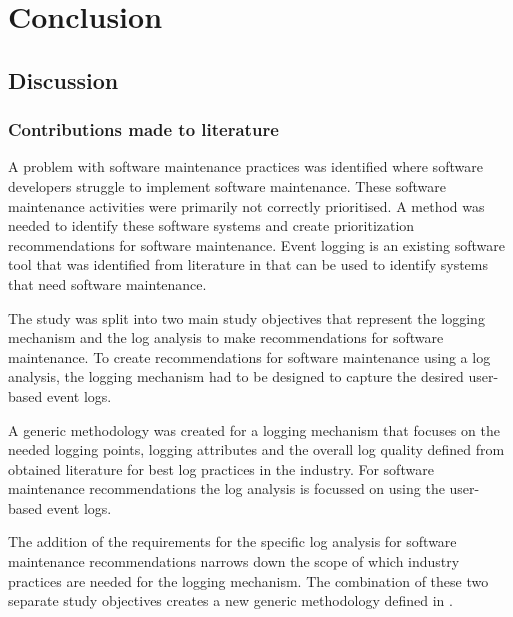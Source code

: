 \chapter{Conclusion}
\label{chap:4}

\section{Discussion}

\subsection{Contributions made to literature}
A problem with software maintenance practices was identified where software developers struggle to implement software maintenance. These software maintenance activities were primarily not correctly prioritised. A method was needed to identify these software systems and create prioritization recommendations for software maintenance. Event logging is an existing software tool that was identified from literature in  that can be used to identify systems that need software maintenance. \par The study was split into two main study objectives that represent the logging mechanism and the log analysis to make recommendations for software maintenance. To create recommendations for software maintenance using a log analysis, the logging mechanism had to be designed to capture the desired user-based event logs. \par A generic methodology was created for a logging mechanism that focuses on the needed logging points, logging attributes and the overall log quality defined from obtained literature for best log practices in the industry. For software maintenance recommendations the log analysis is focussed on using the user-based event logs.\par The addition of the requirements for the specific log analysis for software maintenance recommendations narrows down the scope of which industry practices are needed for the logging mechanism. The combination of these two separate study objectives creates a new generic methodology defined in .

